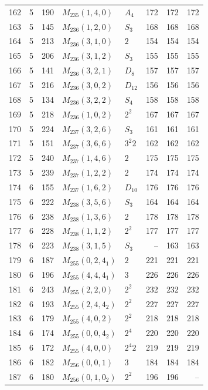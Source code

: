 \documentclass[11pt,a4paper]{article}
\begin{document}
\begin{longtable}{rrr|l|l|rrr}
162 & 5 & 190 & $M_{235}(1,4,0)$ & $A_4$ & 172 & 172 & 172\\
163 & 5 & 145 & $M_{236}(1,2,0)$ & $S_3$ & 168 & 168 & 168\\
164 & 5 & 213 & $M_{236}(3,1,0)$ & $2$ & 154 & 154 & 154\\
165 & 5 & 206 & $M_{236}(3,1,2)$ & $S_3$ & 155 & 155 & 155\\
166 & 5 & 141 & $M_{236}(3,2,1)$ & $D_8$ & 157 & 157 & 157\\
167 & 5 & 216 & $M_{236}(3,0,2)$ & $D_{12}$ & 156 & 156 & 156\\
168 & 5 & 134 & $M_{236}(3,2,2)$ & $S_4$ & 158 & 158 & 158\\
169 & 5 & 218 & $M_{236}(1,0,2)$ & $2^2$ & 167 & 167 & 167\\
170 & 5 & 224 & $M_{237}(3,2,6)$ & $S_3$ & 161 & 161 & 161\\
171 & 5 & 151 & $M_{237}(3,6,6)$ & $3^2 2$ & 162 & 162 & 162\\
172 & 5 & 240 & $M_{237}(1,4,6)$ & $2$ & 175 & 175 & 175\\
173 & 5 & 239 & $M_{237}(1,2,2)$ & $2$ & 174 & 174 & 174\\
174 & 6 & 155 & $M_{237}(1,6,2)$ & $D_{10}$ & 176 & 176 & 176\\
175 & 6 & 222 & $M_{238}(3,5,6)$ & $S_3$ & 164 & 164 & 164\\
176 & 6 & 238 & $M_{238}(1,3,6)$ & $2$ & 178 & 178 & 178\\
177 & 6 & 228 & $M_{238}(1,1,2)$ & $2^2$ & 177 & 177 & 177\\
178 & 6 & 223 & $M_{238}(3,1,5)$ & $S_3$ & -- & 163 & 163\\
179 & 6 & 187 & $M_{255}(0,2,4_1)$ & $2$ & 221 & 221 & 221\\
180 & 6 & 196 & $M_{255}(4,4,4_1)$ & $3$ & 226 & 226 & 226\\
181 & 6 & 243 & $M_{255}(2,2,0)$ & $2^2$ & 232 & 232 & 232\\
182 & 6 & 193 & $M_{255}(2,4,4_2)$ & $2^2$ & 227 & 227 & 227\\
183 & 6 & 179 & $M_{255}(4,0,2)$ & $2^2$ & 218 & 218 & 218\\
184 & 6 & 174 & $M_{255}(0,0,4_2)$ & $2^4$ & 220 & 220 & 220\\
185 & 6 & 172 & $M_{255}(4,0,0)$ & $2^4 2$ & 219 & 219 & 219\\
186 & 6 & 182 & $M_{256}(0,0,1)$ & $3$ & 184 & 184 & 184\\
187 & 6 & 180 & $M_{256}(0,1,0_2)$ & $2^2$ & 196 & 196 & --\\

\end{longtable}
\end{document}
